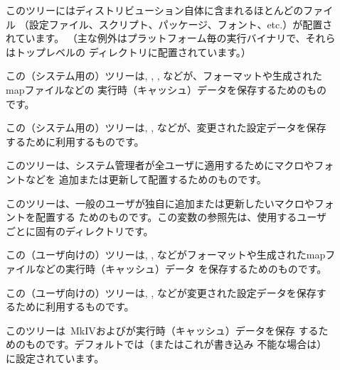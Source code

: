 \documentclass[uplatex,dvipdfmx,12pt,tombow]{jsarticle}
\begin{document}
\begin{description}
\item[]
このツリーには\TL ディストリビューション自体に含まれるほとんどのファイル
（設定ファイル、スクリプト、パッケージ、フォント、etc.）が配置されています。
（主な例外はプラットフォーム毎の実行バイナリで、それらはトップレベルの
ディレクトリに配置されています。）

\item[]
この（システム用の）ツリーは, , , などが、フォーマットや生成されたmapファイルなどの
実行時（キャッシュ）データを保存するためのものです。

\item[]
この（システム用の）ツリーは, , などが、変更された設定データを保存するために利用するものです。

\item[]
このツリーは、システム管理者が全ユーザに適用するためにマクロやフォントなどを
追加または更新して配置するためのものです。

\item[]
このツリーは、一般のユーザが独自に追加または更新したいマクロやフォントを配置する
ためのものです。この変数の参照先は、使用するユーザごとに固有のディレクトリです。

\item[]
この（ユーザ向けの）ツリーは, , などがフォーマットや生成されたmapファイルなどの実行時（キャッシュ）データ
を保存するためのものです。

\item[]
この（ユーザ向けの）ツリーは, , などが変更された設定データを保存するために利用するものです。

\item[]
このツリーは\ConTeXt\ MkIVおよび\LuaLaTeX が実行時（キャッシュ）データを保存
するためのものです。デフォルトでは（またはこれが書き込み
不能な場合は）に設定されています。
\end{description}
\end{document}
